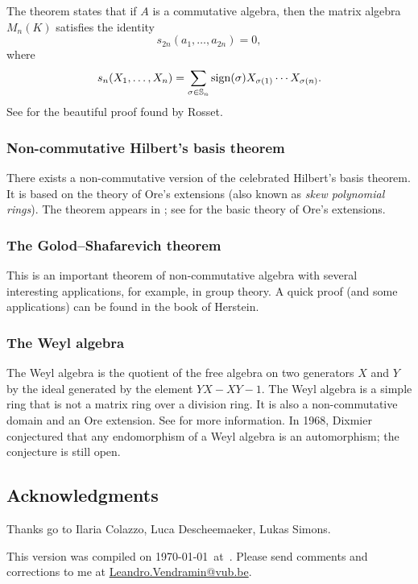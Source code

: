 The theorem states that 
if $A$ is a commutative algebra, then 
the matrix algebra 
$M_n(K)$ satisfies the identity 
\[
s_{2n}(a_{1},\dots ,a_{2n})=0,
\]
where 
\[
s_{n}(X_1,\dots,X_n)=\sum_{\sigma\in\mathbb{S}_n}\operatorname{sign}(\sigma)X_{\sigma(1)}\cdots X_{\sigma(n)}.
\]
See \cite[Theorem 6.39]{MR3308118} for the beautiful 
proof found by Rosset. 

\subsubsection*{Non-commutative Hilbert's basis theorem}

There exists a non-commutative version of the celebrated
Hilbert's basis theorem. It is based on the theory of Ore's extensions (also known as \emph{skew polynomial rings}). The theorem
appears in \cite[I.8.3]{MR1321145}; see \cite[I.7]{MR1321145} 
for the basic theory of Ore's extensions. 

\subsubsection*{The Golod--Shafarevich theorem}

This is an important theorem of non-commutative algebra
with several interesting applications, for example, in group theory. 
A quick proof (and some applications) can be found in the book \cite{MR1449137} of Herstein. 



\subsubsection*{The Weyl algebra}

The Weyl algebra is the quotient of the free algebra on two generators
$X$ and $Y$ by the ideal generated by the element
$YX-XY-1$. The Weyl algebra is a simple ring that is 
not a matrix ring over a division ring. It is also a non-commutative domain and an Ore extension. See \cite{MR1838439} for more information. 
In 1968, Dixmier conjectured that any 
endomorphism of a Weyl algebra is an automorphism; the conjecture
is still open. 

\subsection*{Acknowledgments}

Thanks go to Ilaria Colazzo, 
Luca Descheemaeker, Lukas Simons.   

\bigskip 
This version 
was compiled on \today~at~\currenttime.
Please send comments and corrections to me at \url{Leandro.Vendramin@vub.be}. 



